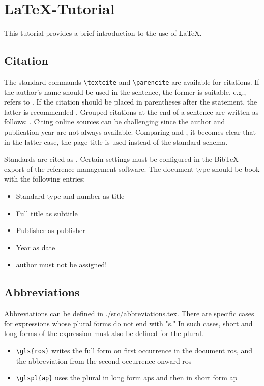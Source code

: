 %
\newpage
\section*{\LaTeX-Tutorial}%
%
This tutorial provides a brief introduction to the use of \LaTeX.%
%
\subsection*{Citation}%
%
The standard commands \verb|\textcite| and \verb|\parencite| are available for citations.
If the author's name should be used in the sentence, the former is suitable, e.g., \textcite[2-3]{Bayerlein_2018} refers to \textcite{Bayerlein_2016}.
If the citation should be placed in parentheses after the statement, the latter is recommended \parencite{Zaeh_2018_cirp}.
Grouped citations at the end of a sentence are written as follows: \parencite{Kleinwort_2018_ijat_2,Kleinwort_2018_pm,Kleinwort_2018_ijat_2}.
Citing online sources can be challenging since the author and publication year are not always available.
Comparing \textcite{Heuss_2018} and \textcite{iwb_Startseite}, it becomes clear that in the latter case, the page title is used instead of the standard schema.\par%
%
Standards are cited as \textcite{ISO_10218_2}.
Certain settings must be configured in the BibTeX export of the reference management software.
The document type should be book with the following entries:%
%
\begin{itemize}%
    \item Standard type and number as title%
    \item Full title as subtitle%
    \item Publisher as publisher%
    \item Year as date%
    \item author must not be assigned!%
\end{itemize}%
%
\subsection*{Abbreviations}%
%
Abbreviations can be defined in {./src/abbreviations.tex}. There are specific cases for expressions whose plural forms do not end with "s." In such cases, short and long forms of the expression must also be defined for the plural.\par%
%
\begin{itemize}%
    \item \verb|\gls{ros}| writes the full form on first occurrence in the document \gls{ros}, and the abbreviation from the second occurrence onward \gls{ros}%
    \item \verb|\glspl{ap}| uses the plural in long form \glspl{ap} and then in short form \gls{ap}%
\end{itemize}%

